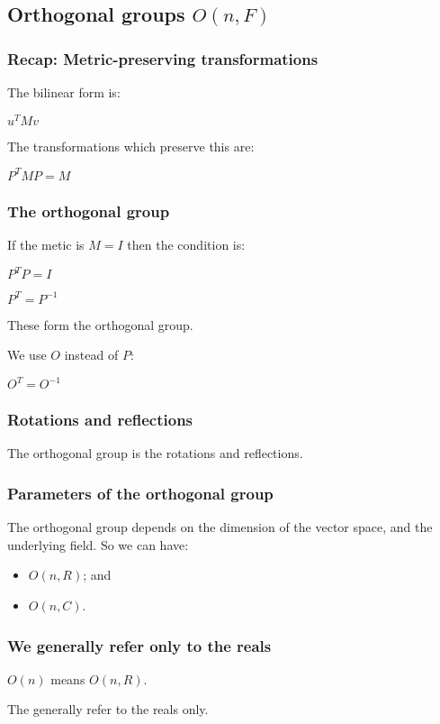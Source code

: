 
\subsection{Orthogonal groups \(O(n, F)\)}

\subsubsection{Recap: Metric-preserving transformations}

The bilinear form is:

\(u^TMv\)

The transformations which preserve this are:

\(P^TMP=M\)

\subsubsection{The orthogonal group}

If the metic is \(M=I\) then the condition is:

\(P^TP=I\)

\(P^T=P^{-1}\)

These form the orthogonal group.

We use \(O\) instead of \(P\):

\(O^T=O^{-1}\)

\subsubsection{Rotations and reflections}

The orthogonal group is the rotations and reflections.

\subsubsection{Parameters of the orthogonal group}

The orthogonal group depends on the dimension of the vector space, and the underlying field. So we can have:
\begin{itemize}
\item \(O(n, R)\); and
\item \(O(n, C)\).
\end{itemize}

\subsubsection{We generally refer only to the reals}

\(O(n)\) means \(O(n,R)\).

The generally refer to the reals only.

